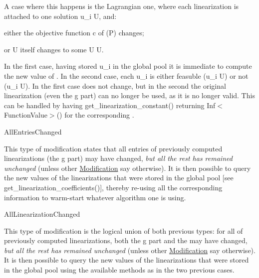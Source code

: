 A case where this happens is the Lagrangian one, where each linearization is attached to one solution u\+\_\+i  U, and\+:


\begin{DoxyItemize}
\item either the objective function c of (P) changes;
\item or U itself changes to some U\textquotesingle{}  U.
\end{DoxyItemize}

In the first case, having stored u\+\_\+i in the global pool it is immediate to compute the new value of . In the second case, each u\+\_\+i is either feasuble (u\+\_\+i  U\textquotesingle{}) or not (u\+\_\+i  U\textquotesingle{}). In the first case  does not change, but in the second the original linearization (even the g part) can no longer be used, as it is no longer valid. This can be handled by having get\+\_\+linearization\+\_\+constant() returning Inf$<$\+Function\+Value$>$() for the corresponding .


\begin{DoxyItemize}
\item All\+Entries\+Changed
\end{DoxyItemize}

This type of modification states that all entries of previously computed linearizations (the g part) may have changed, {\itshape but all the rest has remained unchanged} (unless other \mbox{\hyperlink{class_s_m_spp__di__unipi__it_1_1_modification}{Modification}} say otherwise). It is then possible to query the new values of the linearizations that were stored in the global pool \mbox{[}see get\+\_\+linearization\+\_\+coefficients()\mbox{]}, thereby re-\/using all the corresponding information to warm-\/start whatever algorithm one is using.


\begin{DoxyItemize}
\item All\+Linearization\+Changed
\end{DoxyItemize}

This type of modification is the logical union of both previous types\+: for all of previously computed linearizations, both the g part and the  may have changed, {\itshape but all the rest has remained unchanged} (unless other \mbox{\hyperlink{class_s_m_spp__di__unipi__it_1_1_modification}{Modification}} say otherwise). It is then possible to query the new values of the linearizations that were stored in the global pool using the available methods as in the two previous cases.

